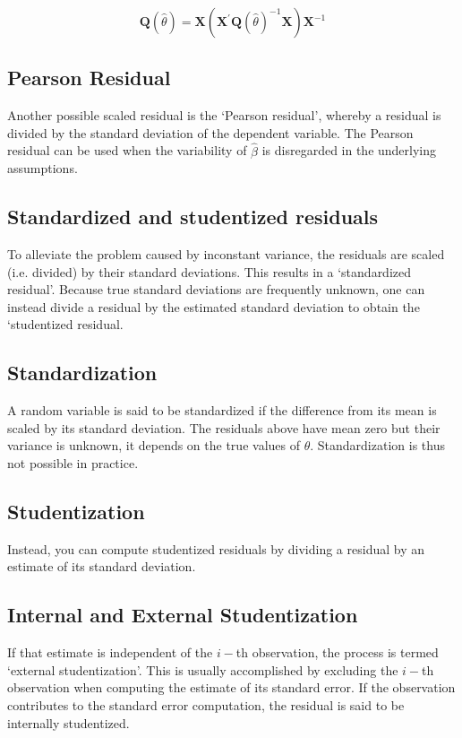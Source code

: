 \documentclass[Main.tex]{subfiles}
\begin{document}
	\[ \boldsymbol{Q} (\hat{\theta}) = \boldsymbol{X} ( \boldsymbol{X}^{\prime}\boldsymbol{Q} (\hat{\theta})^{-1}\boldsymbol{X})\boldsymbol{X}^{-1} \]
	
	\subsection{Pearson Residual}%
	
	Another possible scaled residual is the  `Pearson residual', whereby a residual is divided by the standard deviation of the dependent variable. The Pearson residual can be used when the variability of $\hat{\beta}$ is disregarded in the underlying assumptions.
	

\newpage
\subsection{Standardized and studentized residuals} %


To alleviate the problem caused by inconstant variance, the residuals are scaled (i.e. divided) by their standard deviations. This results in a `standardized residual'. Because true standard deviations are frequently unknown, one can instead divide a residual by the estimated standard deviation to obtain the `studentized residual.


\subsection{Standardization} %


A random variable is said to be standardized if the difference from its mean is scaled by its standard deviation. The residuals above have mean zero but their variance is unknown, it depends on the true values of $\theta$. Standardization is thus not possible in practice.


\subsection{Studentization} %
Instead, you can compute studentized residuals by dividing a residual by an estimate of its standard deviation.


\subsection{Internal and External Studentization} %
If that estimate is independent of the $i-$th observation, the process is termed `external studentization'. This is usually accomplished by excluding the $i-$th observation when computing the estimate of its standard error. If the observation contributes to the
standard error computation, the residual is said to be internally studentized.
\end{document}
